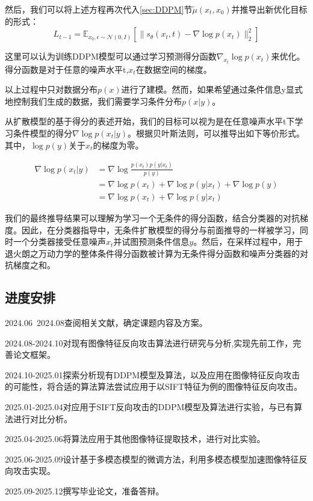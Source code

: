 然后，我们可以将上述方程再次代入\ref{sec:DDPM}节$\widetilde{\mu}(x_t,x_0)$并推导出新优化目标的形式：
\begin{equation}\label{eqn-29}
      L_{t-1}=\mathbb{E}_{x_0,\epsilon \sim \mathcal{N}(0,I)}[\lVert s_\theta(x_t,t) - \nabla \log p(x_t)\rVert^2_2]
\end{equation}

这里可以认为训练DDPM模型可以通过学习预测得分函数$\nabla_{x_t}\log{p(x_t)}$来优化。得分函数是对于任意的噪声水平t,$x_t$在数据空间的梯度。

以上过程中只对数据分布$p ( x )$进行了建模。然而，如果希望通过条件信息y显式地控制我们生成的数据，我们需要学习条件分布$p ( x | y )$。

从扩散模型的基于得分的表述开始，我们的目标可以视为是在任意噪声水平t下学习条件模型的得分$\nabla \log p ( x_t | y )$。根据贝叶斯法则，可以推导出如下等价形式。其中，$\log p ( y )$关于$x_t$的梯度为零。

$$\begin{aligned}
  \nabla \log p (x_t|y)
  &= \nabla \log \frac{
    p(x_t)p(y|x_t)
  }{
    p(y)
  } \\
  &= \nabla \log p(x_t) + \nabla \log p(y|x_t) + \nabla \log p(y) \\
  &= \nabla \log p(x_t) + \nabla \log p(y|x_t)
\end{aligned}$$


我们的最终推导结果可以理解为学习一个无条件的得分函数，结合分类器的对抗梯度。因此，在分类器指导中，无条件扩散模型的得分与前面推导的一样被学习，同时一个分类器接受任意噪声$x_t$并试图预测条件信息$y$。然后，在采样过程中，用于退火朗之万动力学的整体条件得分函数被计算为无条件得分函数和噪声分类器的对抗梯度之和。

\subsection{进度安排}
      2024.06~2024.08\quad 查阅相关文献，确定课题内容及方案。
\par  2024.08-2024.10\quad 对现有图像特征反向攻击算法进行研究与分析,实现先前工作，完善论文框架。
\par  2024.10-2025.01\quad 探索分析现有DDPM模型及算法，以及应用在图像特征反向攻击的可能性，将合适的算法算法尝试应用于以SIFT特征为例的图像特征反向攻击。
\par  2025.01-2025.04\quad 对应用于SIFT反向攻击的DDPM模型及算法进行实验，与已有算法进行对比分析。
\par  2025.04-2025.06\quad 将算法应用于其他图像特征提取技术，进行对比实验。
\par  2025.06-2025.09\quad 设计基于多模态模型的微调方法，利用多模态模型加速图像特征反向攻击实现。
\par  2025.09-2025.12\quad 撰写毕业论文，准备答辩。
